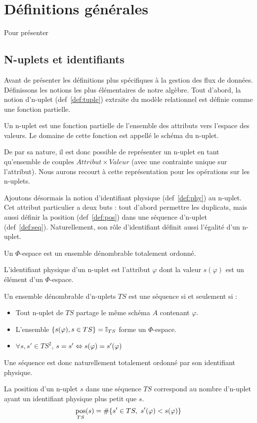 \section{Définitions générales}
Pour présenter 
\subsection{N-uplets et identifiants}
Avant de présenter les définitions plus spécifiques à la gestion des flux de données. Définissons les notions les plus élémentaires de notre algèbre. Tout d'abord, la notion d'n-uplet (def~\ref{def:tuple}) extraite du modèle relationnel est définie comme une fonction partielle.
\begin{defi}[n-uplet]\label{def:tuple}
    Un n-uplet est une fonction partielle de l'ensemble des attributs vers l'espace des valeurs. Le domaine de cette fonction est appellé le schéma du n-uplet.
\end{defi}

De par sa nature, il est donc possible de représenter un n-uplet en tant qu'ensemble de couples $Attribut\times Valeur$ (avec une contrainte unique sur l'attribut). Nous aurons recourt à cette représentation pour les opérations sur les n-uplets.

Ajoutons désormais la notion d'identifiant physique (def~\ref{def:phy}) au n-uplet. Cet attribut particulier a deux buts : tout d'abord permettre les duplicats, mais aussi définir la position (def~\ref{def:pos}) dans une séquence d'n-uplet (def~\ref{def:seq}). Naturellement, son rôle d'identifiant définit aussi l'égalité d'un n-uplet.
\begin{defi}\label{def:phy}
    Un $\Phi$-espace est un ensemble dénombrable totalement ordonné.

    L'identifiant physique d'un n-uplet est l'attribut $\varphi$ dont la valeur $s(\varphi)$ est un élément d'un $\Phi$-espace.
\end{defi}
\begin{defi}\label{def:seq}
    Un ensemble dénombrable d'n-uplets $TS$ est une séquence si et seulement si : 
    \begin{itemize}
     \item Tout n-uplet de $TS$ partage le même schéma $A$ contenant $\varphi$.
     \item L'ensemble $\{s(\varphi), s\in TS\} = \mathbb{I}_{TS}$ forme un $\Phi$-espace.
     \item $\forall s,s' \in TS^2$, $s = s' \Leftrightarrow s(\varphi) = s'(\varphi)$
    \end{itemize}

    Une séquence est donc naturellement totalement ordonné par son identifiant physique.
\end{defi}
\begin{defi}\label{def:pos}
    La position d'un n-uplet $s$ dans une séquence $TS$ correspond au nombre d'n-uplet ayant un identifiant physique plus petit que $s$.
    $$\mathop{\mathrm{pos}}_{TS}(s) = \#\{s'\in TS,\ s'(\varphi) < s(\varphi) \}$$
\end{defi}

